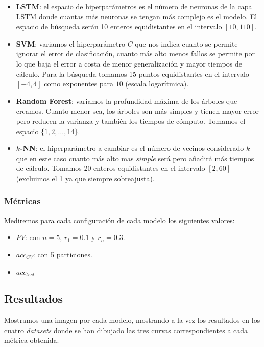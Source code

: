 \begin{itemize}
  \item \textbf{LSTM}: el espacio de hiperparámetros es el número de neuronas de la capa LSTM donde cuantas más neuronas se tengan más complejo es el modelo. El espacio de búsqueda serán 10 enteros equidistantes en el intervalo $[10, 110]$.
  \item \textbf{SVM}: variamos el hiperparámetro $C$ que nos indica cuanto se permite ignorar el error de clasificación, cuanto más alto menos fallos se permite por lo que baja el error a costa de menor generalización y mayor tiempos de cálculo. Para la búsqueda tomamos 15 puntos equidistantes en el intervalo $[-4, 4]$ como exponentes para $10$ (escala logarítmica).
  \item \textbf{Random Forest}: variamos la profundidad máxima de los árboles que creamos. Cuanto menor sea, los árboles son más simples y tienen mayor error pero reducen la varianza y también los tiempos de cómputo. Tomamos el espacio $\{1, 2, \ldots, 14\}$.
  \item \textbf{$k$-NN}: el hiperparámetro a cambiar es el número de vecinos considerado $k$ que en este caso cuanto más alto mas \emph{simple} será pero añadirá más tiempos de cálculo. Tomamos 20 enteros equidistantes en el intervalo $[2, 60]$ (excluimos el 1 ya que siempre sobreajusta).
\end{itemize}

\subsubsection{Métricas}

Mediremos para cada configuración de cada modelo los siguientes valores:

\begin{itemize}
  \item $PV$: con $n = 5$, $r_1 = 0.1$ y $r_n = 0.3$.
  \item $acc_{CV}$: con 5 particiones.
  \item $acc_{test}$
\end{itemize}

\subsection{Resultados}

Mostramos una imagen por cada modelo, mostrando a la vez los resultados en los cuatro \emph{datasets} donde se han dibujado las tres curvas correspondientes a cada métrica obtenida.

